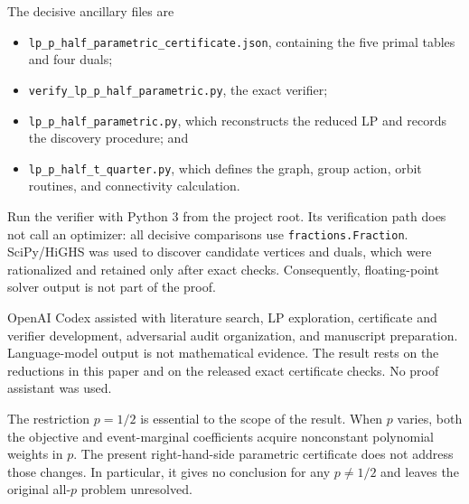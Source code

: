 \documentclass[11pt]{article}
\begin{document}
The decisive ancillary files are
\begin{itemize}
\item \texttt{lp\_p\_half\_parametric\_certificate.json}, containing the five
  primal tables and four duals;
\item \texttt{verify\_lp\_p\_half\_parametric.py}, the exact verifier;
\item \texttt{lp\_p\_half\_parametric.py}, which reconstructs the reduced LP
  and records the discovery procedure; and
\item \texttt{lp\_p\_half\_t\_quarter.py}, which defines the graph, group
  action, orbit routines, and connectivity calculation.
\end{itemize}
Run the verifier with Python 3 from the project root.  Its verification path
does not call an optimizer: all decisive comparisons use
\texttt{fractions.Fraction}.  SciPy/HiGHS was used to discover candidate
vertices and duals, which were rationalized and retained only after exact
checks.  Consequently, floating-point solver output is not part of the proof.

OpenAI Codex assisted with literature search, LP exploration, certificate and
verifier development, adversarial audit organization, and manuscript
preparation.  Language-model output is not mathematical evidence.  The result
rests on the reductions in this paper and on the released exact certificate
checks.  No proof assistant was used.

The restriction $p=1/2$ is essential to the scope of the result.  When $p$
varies, both the objective and event-marginal coefficients acquire nonconstant
polynomial weights in $p$.  The present right-hand-side parametric certificate
does not address those changes.  In particular, it gives no conclusion for
any $p\neq1/2$ and leaves the original all-$p$ problem unresolved.



\end{document}
